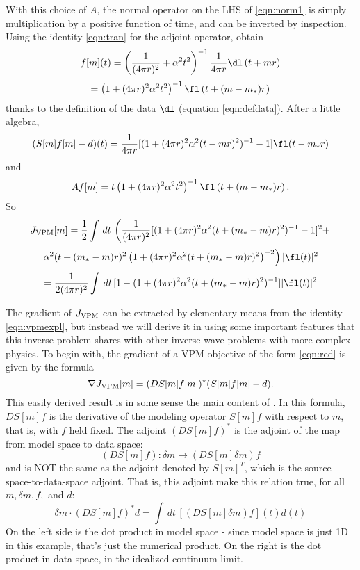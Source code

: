 With this choice of $A$, the normal operator on the LHS of \ref{eqn:norm1} is simply multiplication by a positive function of time, and can be inverted by inspection. Using the identity \ref{eqn:tran} for the adjoint operator, obtain
\[
f[m](t) = \left(\frac{1}{(4\pi r)^2} + \alpha^2
  t^2\right)^{-1}\frac{1}{4\pi r}\dl\left(t+mr\right)
\]
\begin{equation}
\label{eqn:solnnon}
= \left(1+ (4\pi r)^2\alpha^2 t^2\right)^{-1}\fl\left(t+(m-m_*)r\right) 
\end{equation}
thanks to the definition of the data $\dl$ (equation \ref{eqn:defdata}).
After a little algebra,
\begin{equation}
\label{eqn:resid}
(S[m]f[m]-d)(t) =\frac{1}{4\pi r}[ (1+(4\pi r)^2 \alpha^2 (t-mr)^2)^{-1} - 1]\fl(t-m_*r)
\end{equation}
and
\begin{equation}
  \label{eqn:anniexp}
  Af[m] = t \left(1+ (4\pi r)^2\alpha^2
    t^2\right)^{-1}\fl\left(t+(m-m_*)r\right).
\end{equation}
So
\[
  J_{\rm VPM}[m] = \frac{1}{2}\int\,dt\, \left( \frac{1}{(4\pi r)^2}[
    (1+(4\pi r)^2 \alpha^2 (t+(m_*-m)r)^2)^{-1} - 1]^2 +
  \right.
  \]
  \[
   \left. \alpha^2(t+(m_*-m)r)^2 \left(1+ (4\pi r)^2\alpha^2
      (t+(m_*-m)r)^2\right)^{-2}\right)|\fl(t)|^2
\]
\begin{equation}
\label{eqn:vpmexpl}
=\frac{1}{2(4\pi r)^2}\int\,dt\, [1-(1+(4\pi r)^2 \alpha^2
(t+(m_*-m)r)^2)^{-1}]|\fl(t)|^2
\end{equation}

The gradient of $J_{\rm VPM}$ can be extracted by elementary means
from the identity \ref{eqn:vpmexpl}, but instead we will derive it in
using some important features that this inverse problem shares with
other inverse wave problems with more complex physics. To begin with, the gradient of a VPM
objective of the form \ref{eqn:red} is given by the formula 
\begin{equation}
\label{eqn:grad}
\nabla J_{\rm VPM}[m] = (DS[m]f[m])^*(S[m]f[m]-d).
\end{equation}
This easily derived result is in some sense the main content of \cite[]{GolubPereyra:03}.  In this formula, $DS[m]f$ is the derivative
of the modeling operator $S[m]f$
with respect to $m$, that is, with $f$ held fixed. The adjoint $(DS[m]f)^*$ is the adjoint of the map from model space to data space:
\[
(DS[m]f): \delta m \mapsto (DS[m]\delta m)f
\]
and is NOT the same as the adjoint denoted by $S[m]^T$, which is the source-space-to-data-space adjoint.
That is, this adjoint make this relation true, for all $m, \delta m,f,$ and $d$:
\begin{equation}
\label{eqn:vadj}
\delta m \cdot (DS[m]f)^*d = \int \,dt\,[(DS[m]\delta m)f] (t) d(t) 
\end{equation}
On the left side is the dot product in model space - since model space
is just 1D in this example, that's just the numerical product. On the
right is the dot product in data space, in the idealized continuum
limit.

